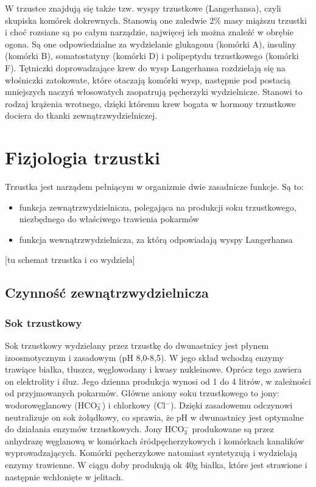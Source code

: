 \documentclass[a4paper, 12pt]{report}
\begin{document}
W trzustce znajdują się także tzw. wyspy trzustkowe (Langerhansa),
czyli skupiska komórek dokrewnych. Stanowią one zaledwie 2\% masy
miąższu trzustki i choć rozsiane są po całym narządzie, najwięcej
ich można znaleźć w obrębie ogona. Są one odpowiedzialne za
wydzielanie glukagonu (komórki A), insuliny (komórki B), somatostatyny
(komórki D) i polipeptydu trzustkowego (komórki F). Tętniczki
doprowadzające krew do wysp Langerhansa rozdzielają się na włośniczki
zatokowate, które otaczają komórki wysp, następnie pod postacią
mniejszych naczyń włosowatych zaopatrują pęcherzyki wydzielnicze. 
Stanowi to rodzaj krążenia wrotnego, dzięki któremu krew bogata w
hormony trzustkowe dociera do tkanki
zewnątrzwydzielniczej.\cite{szczeklik}\cite{traczyk}

\chapter{Fizjologia trzustki}
Trzustka jest narządem pełniącym w organizmie dwie zasadnicze
funkcje. Są to:
\begin{itemize}
\setlength{\itemsep}{0cm}
\setlength{\parskip}{0cm}
\item funkcja zewnątrzwydzielnicza, polegająca na produkcji soku
  trzustkowego, niezbędnego do właściwego trawienia pokarmów
\item funkcja wewnątrzwydzielnicza, za którą odpowiadają wyspy
  Langerhansa
\end{itemize}

[tu schemat trzustka i co wydziela]

\section{Czynność zewnątrzwydzielnicza}
\subsection{Sok trzustkowy}
Sok trzustkowy wydzielany przez trzustkę do dwunastnicy jest płynem
izoosmotycznym i zasadowym (pH 8,0-8,5). W jego skład wchodzą enzymy
trawiące białka, tłuszcz, węglowodany i kwasy nukleinowe. Oprócz tego
zawiera on elektrolity i śluz. Jego dzienna produkcja wynosi od 1 do 4
litrów, w zależności od przyjmowanych pokarmów. Główne aniony soku
trzustkowego to jony: wodorowęglanowy (HCO$_3^-$) i chlorkowy
(Cl$^-$). Dzięki zasadowemu odczynowi neutralizuje on sok żołądkowy, 
co sprawia, że pH w dwunastnicy jest optymalne do działania enzymów
trzustkowych. Jony HCO$_3^-$ produkowane są przez anhydrazę węglanową
w komórkach śródpęcherzykowych i komórkach kanalików wyprowadzających.
Komórki pęcherzykowe natomiast syntetyzują i wydzielają enzymy
trawienne. W ciągu doby produkują ok 40g białka, które jest strawione
i następnie wchłonięte w jelitach\cite{szczeklik}.
\end{document}
